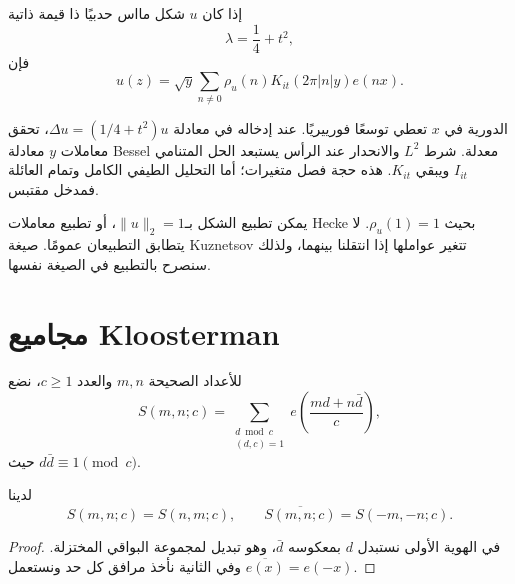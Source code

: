 \begin{theorem}
\label{prop:maass-fourier-whittaker}
إذا كان \(u\) شكل مااس حدبيًا ذا قيمة ذاتية
\[
\lambda=\frac14+t^2,
\]
فإن
\[
u(z)
=
\sqrt y\sum_{n\ne0}\rho_u(n)
K_{it}(2\pi|n|y)e(nx).
\]
\end{theorem}

\begin{remark}
الدورية في \(x\) تعطي توسعًا فورييريًا. عند إدخاله في معادلة
\(\Delta u=(1/4+t^2)u\)، تحقق معاملات \(y\) معادلة Bessel معدلة.
شرط \(L^2\) والانحدار عند الرأس يستبعد الحل المتنامي \(I_{it}\) ويبقي
\(K_{it}\). هذه حجة فصل متغيرات؛ أما التحليل الطيفي الكامل وتمام العائلة
فمدخل مقتبس.
\end{remark}

\begin{remark}
يمكن تطبيع الشكل بـ\(\|u\|_2=1\)، أو تطبيع معاملات Hecke بحيث
\(\rho_u(1)=1\). لا يتطابق التطبيعان عمومًا. صيغة Kuznetsov تتغير
عواملها إذا انتقلنا بينهما، ولذلك سنصرح بالتطبيع في الصيغة نفسها.
\end{remark}

\section{مجاميع Kloosterman}

\begin{definition}
\label{def:kloosterman-sum}
\provedhere
للأعداد الصحيحة \(m,n\) والعدد \(c\ge1\)، نضع
\[
S(m,n;c)
=
\sum_{\substack{d\bmod c\\(d,c)=1}}
e\!\left(\frac{md+n\bar d}{c}\right),
\]
حيث \(d\bar d\equiv1\pmod c\).
\end{definition}

\begin{proposition}
\label{prop:kloosterman-elementary-symmetries}
\provedhere
لدينا
\[
S(m,n;c)=S(n,m;c),
\qquad
\overline{S(m,n;c)}=S(-m,-n;c).
\]
\end{proposition}

\begin{proof}
في الهوية الأولى نستبدل \(d\) بمعكوسه \(\bar d\)، وهو تبديل لمجموعة
البواقي المختزلة. وفي الثانية نأخذ مرافق كل حد ونستعمل
\(\overline{e(x)}=e(-x)\).
\end{proof}

